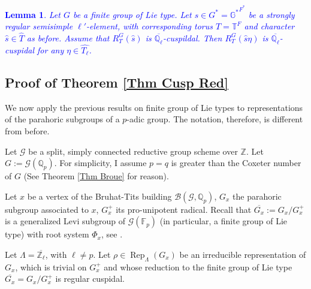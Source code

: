 \documentclass{article}
\newcommand{\blue}[1]{\textcolor{blue}{#1}}
\newtheorem{lemma}{Lemma}
\newtheorem{definition}{Definition}
\newcommand{\Rep}{\operatorname{Rep}}
\begin{document}
    \blue{
    \begin{lemma}\label{Lem Q_l-bar cuspidal}
    	Let $G$ be a finite group of Lie type. Let $s \in G^*=\mathbb{G^*}^{F^*}$ be a strongly regular semisimple $\ell'$-element, with corresponding torus $T=\mathbb{T}^F$ and character $\hat{s} \in \hat{T}$ as before. Assume that $R_T^G(\hat{s})$ is $\overline{\mathbb{Q}_{\ell}}$-cuspildal. Then $R_T^G(\hat{s}\eta)$ is $\overline{\mathbb{Q}_{\ell}}$-cuspidal for any $\eta \in \hat{T_{\ell}}$.
    \end{lemma}
    }
	
	

	
	
	
	\subsection{Proof of Theorem \ref{Thm Cusp Red}}
	
	We now apply the previous results on finite group of Lie types to representations of the parahoric subgroups of a $p$-adic group. The notation, therefore, is different from before.
	
	Let $\mathcal{G}$ be a split, simply connected reductive group scheme over $\mathbb{Z}$. Let $G:=\mathcal{G}(\mathbb{Q}_p)$. For simplicity, I assume $p=q$ is greater than the Coxeter number of $G$ (See Theorem \ref{Thm Broue} for reason).
	
	Let $x$ be a vertex of the Bruhat-Tits building $\mathcal{B}(\mathcal{G}, \mathbb{Q}_p)$, $G_x$ the parahoric subgroup associated to $x$, $G_x^+$ its pro-unipotent radical. Recall that $\overline{G_x}:=G_x/G_x^+$ is a generalized Levi subgroup of $\mathcal{G}(\mathbb{F}_p)$ (in particular, a finite group of Lie type) with root system $\Phi_x$, see \cite[Theorem 3.17]{rabinoff2003bruhat}. 
	
	Let $\Lambda=\overline{\mathbb{Z}_\ell}$, with $\ell \neq p$. Let $\rho \in \Rep_{\Lambda}(G_x)$ be an irreducible representation of $G_x$, which is trivial on $G_x^+$ and whose reduction to the finite group of Lie type $\overline{G_x}=G_x/G_x^+$ is regular cuspidal. 
	
	
\end{document}
